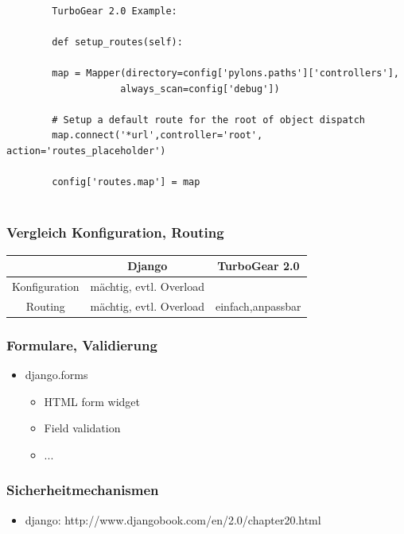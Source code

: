 \documentclass[
    t,
    smaller,
    compress,
]{beamer}
\begin{document}
	
	\begin{verbatim}
	
		TurboGear 2.0 Example:
	
		def setup_routes(self):
		
		map = Mapper(directory=config['pylons.paths']['controllers'],
		            always_scan=config['debug'])
		
		# Setup a default route for the root of object dispatch
		map.connect('*url',controller='root', action='routes_placeholder')

		config['routes.map'] = map
				
	\end{verbatim}
	
\begin{frame}
	\frametitle{Vergleich Konfiguration, Routing}
	
	
	\begin{table}[h]
		\begin{tabular}{|c|c|c|}
			\hline
			 & Django & TurboGear 2.0  \\ \hline
		  	Konfiguration & \cellcolor{orange} mächtig, evtl. Overload  &  \\ \hline
		  	Routing & \cellcolor{orange} mächtig, evtl. Overload & \cellcolor{green} einfach,anpassbar	   \\ \hline
		 \end{tabular}
	\end{table}

	
\end{frame}

\begin{frame}
  \frametitle{Formulare, Validierung}
  
  \begin{itemize}[<1->]
    \item django.forms
	 \begin{itemize}[<1->]
		\item HTML form widget
		\item Field validation
		\item ...
	\end{itemize}
  \end{itemize}

\end{frame}


\begin{frame}
  \frametitle{Sicherheitmechanismen}
  
  \begin{itemize}[<1->]
    \item django: http://www.djangobook.com/en/2.0/chapter20.html
    \end{itemize}

\end{frame}
\end{document}
